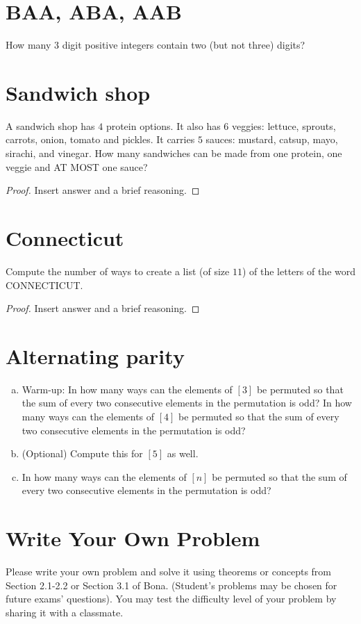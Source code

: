 \documentclass[12pt]{amsart}
\begin{document}
\section{BAA, ABA, AAB}
How many 3 digit positive integers contain two (but not three) digits?


\section{Sandwich shop} 
A sandwich shop has $4$ protein options. 
It also has $6$ veggies: lettuce, sprouts, carrots, onion, tomato and pickles. It carries $5$ sauces: mustard, catsup, mayo, sirachi, and vinegar. How many sandwiches can be made from one protein, one veggie and AT MOST one sauce?
\begin{proof}
Insert answer and a brief reasoning.
\end{proof}



\section{Connecticut}
Compute the number of ways to create a  list (of size $11$) of the letters of the word CONNECTICUT. 
\begin{proof}
Insert answer and a brief reasoning.
\end{proof}

\section{Alternating parity}
\begin{enumerate}[a)]
    \item Warm-up: In how many ways can the elements of $[3]$ be permuted so that the sum of every two consecutive elements in the permutation is odd? 
    In how many ways can the elements of $[4]$ be permuted so that the sum of every two consecutive elements in the permutation is odd?

    \item (Optional) Compute this for $[5]$ as well.

    \item In how many ways can the elements of $[n]$ be permuted so that the sum of every two consecutive elements in the permutation is odd?
\end{enumerate}



\section{Write Your Own Problem}\label{sec:write_your_own}
Please write your own problem and solve it using theorems or concepts from Section 2.1-2.2 or Section 3.1 of Bona.
(Student's problems may be chosen for future exams' questions). You may test the difficulty level of your problem by sharing it with a classmate. 
\end{document}
